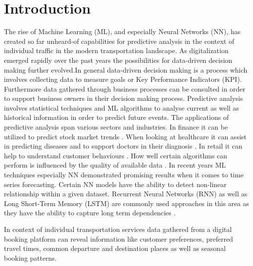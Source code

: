 %
%
% 
% 
% 

\chapter{Introduction}
\label{chap:introduction}
The rise of Machine Learning (ML), and especially Neural Networks (NN), has created so far unheard-of capabilities for predictive analysis in the context of individual traffic in the modern transportation landscape. As digitalization emerged rapidly over the past years the possibilities for data-driven decision making further evolved.In general data-driven decision making is a process which involves collecting data to measure goals or Key Performance Indicators (KPI). Furthermore data gathered through business processes can be consulted in order to support business owners in their decision making process.
\newline
\newline
Predictive analysis involves statistical techniques and ML algorithms to analyse current as well as historical information in order to predict future events. The applications of predictive analysis span various sectors and industries. In finance it can be utilized to predict stock market trends \cite{stock_market}. When looking at healthcare it can assist in predicting diseases and to support doctors in their diagnosis \cite{health_care}. In retail it can help to understand customer behaviours \cite{retail}. How well certain algorithms can perform is influenced by the quality of available data \cite{data_qual}. In recent years ML techniques especially NN demonstrated promising results when it comes to time series forecasting. Certain NN models have the ability to detect non-linear relationship within a given dataset. Recurrent Neural Networks (RNN) as well as Long Short-Term Memory (LSTM) are commonly used approaches in this area as they have the ability to capture long term dependencies \cite{intro_ml_1}.
\newline
\newline




In context of individual transportation services data gathered from a digital booking platform can reveal information like customer preferences, preferred travel times, common departure and destination places as well as seasonal booking patterns. 